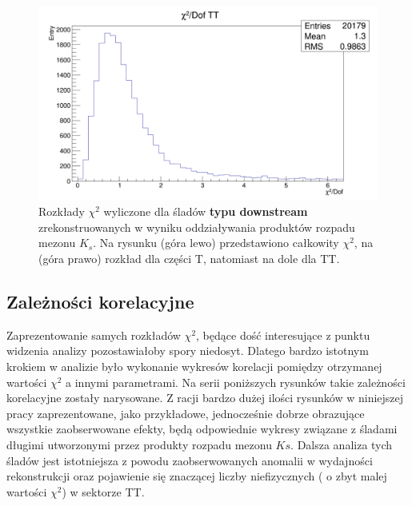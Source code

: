 \begin{figure}[H]
\vspace*{0.5cm} %
\hspace{\fill}
\begin{minipage}[t]{\textwidth}
\centering
\includegraphics[scale=0.2]{rozdzial6/KsLL_chi2TT.png}
\end{minipage}
\caption{Rozkłady $\chi^2$ wyliczone dla śladów \textbf{typu downstream} zrekonstruowanych w wyniku oddziaływania produktów rozpadu mezonu $K_s$. Na rysunku (góra lewo) przedstawiono całkowity $\chi^2$, na (góra prawo) rozkład dla części T, natomiast na dole dla  TT. } \label{chi2KsDD}
\end{figure}

\subsection{Zależności korelacyjne}
Zaprezentowanie samych rozkładów $\chi^2$, będące dość interesujące z punktu widzenia analizy pozostawiałoby spory niedosyt. Dlatego bardzo istotnym krokiem w analizie było wykonanie wykresów korelacji pomiędzy otrzymanej wartości $\chi^2$ a innymi parametrami. Na serii poniższych rysunków takie  zależności korelacyjne zostały narysowane. Z racji bardzo dużej ilości rysunków w niniejszej pracy zaprezentowane, jako przykładowe, jednocześnie dobrze obrazujące wszystkie  zaobserwowane efekty, będą odpowiednie wykresy związane z śladami długimi utworzonymi przez produkty rozpadu mezonu $Ks$. Dalsza analiza tych śladów jest istotniejsza z powodu zaobserwowanych anomalii w wydajności rekonstrukcji oraz  pojawienie się znaczącej liczby niefizycznych ( o zbyt malej wartości $\chi^2$) w sektorze TT. 

